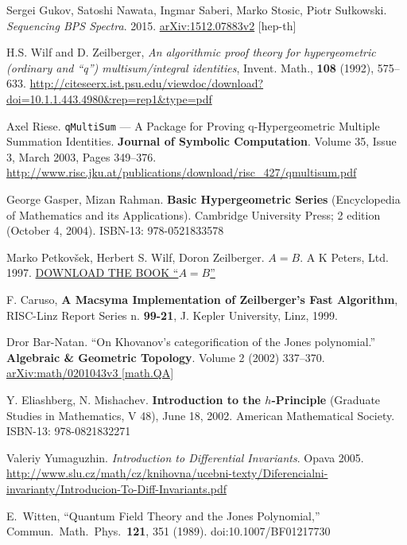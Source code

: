 \documentclass[10pt]{amsart}
\begin{document}
\begin{thebibliography}{9}
Sergei Gukov, Satoshi Nawata, Ingmar Saberi, Marko Stosic, Piotr Su\l kowski.  \emph{Sequencing BPS Spectra}.  2015.  \href{http://arxiv.org/abs/1512.07883v2}{arXiv:1512.07883v2} [hep-th]





H.S. Wilf and D. Zeilberger, \emph{An algorithmic proof theory for hypergeometric (ordinary and “q”) multisum/integral identities}, Invent. Math., \textbf{108} (1992), 575–633.  \url{http://citeseerx.ist.psu.edu/viewdoc/download?doi=10.1.1.443.4980&rep=rep1&type=pdf}

Axel Riese.  \verb|qMultiSum| — A Package for Proving q-Hypergeometric Multiple Summation Identities. \textbf{Journal of Symbolic Computation}. Volume 35, Issue 3, March 2003, Pages 349–376.  \url{http://www.risc.jku.at/publications/download/risc_427/qmultisum.pdf}

George Gasper, Mizan Rahman.  \textbf{Basic Hypergeometric Series} (Encyclopedia of Mathematics and its Applications).  Cambridge University Press; 2 edition (October 4, 2004). ISBN-13: 978-0521833578

Marko Petkov\v{s}ek, Herbert S. Wilf, Doron Zeilberger. \textbf{$A=B$}.  A K Peters, Ltd. 1997. \href{https://www.math.upenn.edu/~wilf/Downld.html}{DOWNLOAD THE BOOK ``$A=B$''}
 
F. Caruso, \textbf{A Macsyma Implementation of Zeilberger's Fast Algorithm}, RISC-Linz Report Series n. \textbf{99-21}, J. Kepler University, Linz, 1999.

Dror Bar-Natan. ``On Khovanov’s categorification of the Jones polynomial.'' \textbf{Algebraic \& Geometric Topology}.  Volume 2 (2002) 337–370.  \href{http://arxiv.org/abs/math/0201043}{arXiv:math/0201043v3 [math.QA]}


Y. Eliashberg, N. Mishachev.  \textbf{Introduction to the $h$-Principle} (Graduate Studies in Mathematics, V 48), June 18, 2002.  American Mathematical Society. ISBN-13: 978-0821832271


Valeriy Yumaguzhin.  \emph{Introduction to Differential Invariants}.  Opava 2005.  \url{http://www.slu.cz/math/cz/knihovna/ucebni-texty/Diferencialni-invarianty/Introducion-To-Diff-Invariants.pdf}






  E.~Witten,
  ``Quantum Field Theory and the Jones Polynomial,''
  Commun.\ Math.\ Phys.\  {\bf 121}, 351 (1989).
  doi:10.1007/BF01217730


\end{thebibliography}
\end{document}
